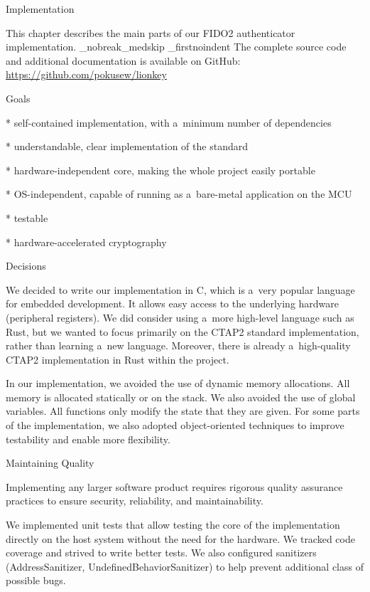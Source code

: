 \chap[implementation] Implementation

This chapter describes the main parts of our FIDO2 authenticator implementation.
\_nobreak\_medskip
\_firstnoindent
The complete source code and additional documentation is available on GitHub:\nl
\url{https://github.com/pokusew/lionkey}


\sec Goals

\begitems

* self-contained implementation, with {\sbf a~minimum number of dependencies}

* understandable, clear implementation of the standard

* hardware-independent core, making the whole project easily portable

* OS-independent, capable of running as a~bare-metal application on the MCU

* testable

* hardware-accelerated cryptography

\enditems


\sec Decisions

We decided to write our implementation in {\sbf C}, which is a~very popular language for embedded development. It allows easy access to the underlying hardware (peripheral registers). We did consider using a~more high-level language such as Rust, but we wanted to focus primarily on the CTAP2 standard implementation, rather than learning a~new language. Moreover, there is already a~high-quality CTAP2 implementation in Rust within the  project.

In our implementation, we avoided the use of dynamic memory allocations. All memory is allocated statically or on the stack. We also avoided the use of global variables. All functions only modify the state that they are given. For some parts of the implementation, we also adopted object-oriented techniques to improve testability and enable more flexibility.


\sec Maintaining Quality

Implementing any larger software product requires rigorous quality assurance practices to ensure security, reliability, and maintainability.

We implemented unit tests that allow testing the core of the implementation directly on the host system without the need for the hardware. We tracked code coverage and strived to write better tests. We also configured sanitizers (AddressSanitizer, UndefinedBehaviorSanitizer) to help prevent additional class of possible bugs.

